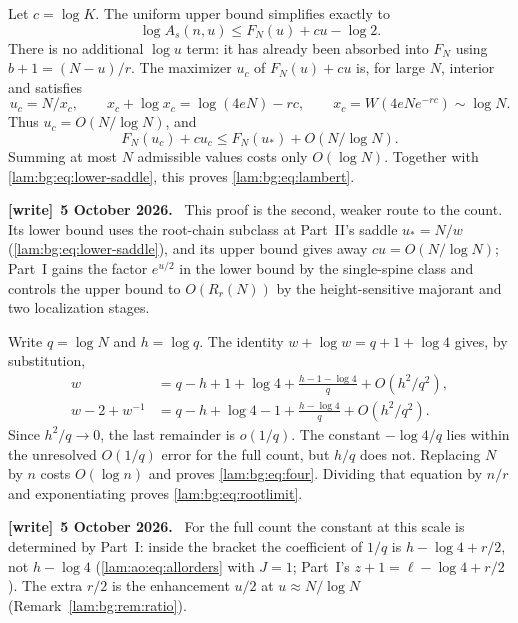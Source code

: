 \documentclass[11pt,a4paper]{article}
\numberwithin{equation}{section}
\theoremstyle{remark}
\newenvironment{writenote}[1][]{\par\smallskip\begingroup\small
 \noindent\textbf{[write]}\if\relax\detokenize{#1}\relax\else~\textbf{#1.}\fi\ }%
 {\par\endgroup\smallskip}
\begin{document}
Let $c=\log K$. The uniform upper bound simplifies exactly to
\begin{equation}\label{lam:bg:eq:upper-individual}
 \log A_s(n,u)\le F_N(u)+cu-\log2.
\end{equation}
There is no additional $\log u$ term: it has already been absorbed into $F_N$ using $b+1=(N-u)/r$. The maximizer $u_c$ of $F_N(u)+cu$ is, for large $N$, interior and satisfies
\[
 u_c=N/x_c,\qquad
 x_c+\log x_c=\log(4eN)-rc,
 \qquad x_c=W(4eNe^{-rc})\sim\log N.
\]
Thus $u_c=O(N/\log N)$, and
\[
 F_N(u_c)+cu_c\le F_N(u_*)+O(N/\log N).
\]
Summing at most $N$ admissible values costs only $O(\log N)$. Together with \eqref{lam:bg:eq:lower-saddle}, this proves \eqref{lam:bg:eq:lambert}.
\begin{writenote}[5 October 2026]
This proof is the second, weaker route to the count. Its lower bound uses the root-chain subclass at Part~II's saddle $u_*=N/w$ (\eqref{lam:bg:eq:lower-saddle}), and its upper bound gives away $cu=O(N/\log N)$; Part~I gains the factor $e^{u/2}$ in the lower bound by the single-spine class and controls the upper bound to $O(R_r(N))$ by the height-sensitive majorant and two localization stages.
\end{writenote}

Write $q=\log N$ and $h=\log q$. The identity $w+\log w=q+1+\log4$ gives, by substitution,
\begin{align*}
 w&=q-h+1+\log4+\frac{h-1-\log4}{q}
                              +O(h^2/q^2),\\
 w-2+w^{-1}&=q-h+\log4-1+\frac{h-\log4}{q}
                              +O(h^2/q^2).
\end{align*}
Since $h^2/q\to0$, the last remainder is $o(1/q)$. The constant $-\log4/q$ lies within the unresolved $O(1/q)$ error for the full count, but $h/q$ does not. Replacing $N$ by $n$ costs $O(\log n)$ and proves \eqref{lam:bg:eq:four}. Dividing that equation by $n/r$ and exponentiating proves \eqref{lam:bg:eq:rootlimit}.
\begin{writenote}[5 October 2026]
For the full count the constant at this scale is determined by Part~I: inside the bracket the coefficient of $1/q$ is $h-\log4+r/2$, not $h-\log4$ (\eqref{lam:ao:eq:allorders} with $J=1$; Part~I's $z+1=\ell-\log4+r/2$). The extra $r/2$ is the enhancement $u/2$ at $u\approx N/\log N$ (Remark~\ref{lam:bg:rem:ratio}).
\end{writenote}
\end{document}
